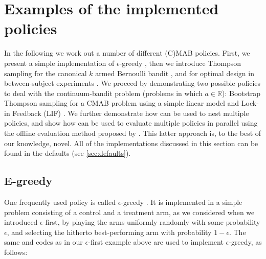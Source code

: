 \documentclass[nojss]{jss}
\begin{document}
\section{Examples of the implemented policies}
\label{sec:examples}

In the following we work out a number of different (C)MAB policies. First, we present a simple implementation of $\epsilon$-greedy \citep{sutton1998introduction}, then we introduce Thompson sampling for the canonical $k$ armed Bernoulli bandit \citep{thompson1933likelihood}, and for optimal design in between-subject experiments \citep{Kaptein2014a}. We proceed by demonstrating two possible policies to deal with the continuum-bandit problem (problems in which $a \in \mathbb{R}$): Bootstrap Thompson sampling for a CMAB problem using a simple linear model \citep{Kaptein} and Lock-in Feedback (LIF) \citep{Kaptein2014d}. We further demonstrate how  can be used to nest multiple policies, and show how  can be used to evaluate multiple policies in parallel using the offline evaluation method proposed by \citet{Li2010a}. This latter approach is, to the best of our knowledge, novel. All of the implementations discussed in this section can be found in the defaults (see \ref{sec:defaults}).

\subsection{E-greedy}
\label{subsec:egreedy}

One frequently used policy is called $\epsilon$-greedy \citep{sutton1998introduction}. It is implemented in a simple problem consisting of a control and a treatment arm, as we considered when we introduced $ \epsilon$-first, by playing the arms uniformly randomly with some probability $\epsilon$, and selecting the hitherto best-performing arm with probability $1-\epsilon$. The same  and  codes as in our $\epsilon$-first example above are used to implement $\epsilon$-greedy, as follows:
\end{document}
